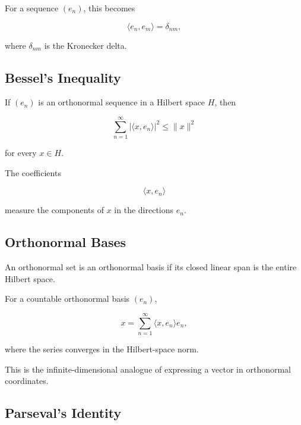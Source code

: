 For a sequence \((e_n)\), this becomes

\[
\boxed{
\langle e_n,e_m\rangle
=
\delta_{nm},
}
\]

where \(\delta_{nm}\) is the Kronecker delta.

\subsection{Bessel's Inequality}
\label{subsec:bessels-inequality}

\begin{theorem}
If \((e_n)\) is an orthonormal sequence in a Hilbert space \(H\), then

\[
\boxed{
\sum_{n=1}^{\infty}
|\langle x,e_n\rangle|^2
\leq
\|x\|^2
}
\]

for every \(x\in H\).
\end{theorem}

The coefficients

\[
\langle x,e_n\rangle
\]

measure the components of \(x\) in the directions \(e_n\).

\subsection{Orthonormal Bases}
\label{subsec:orthonormal-bases}

An orthonormal set is an orthonormal basis if its closed linear span is the
entire Hilbert space.

For a countable orthonormal basis \((e_n)\),

\[
\boxed{
x
=
\sum_{n=1}^{\infty}
\langle x,e_n\rangle e_n,
}
\]

where the series converges in the Hilbert-space norm.

This is the infinite-dimensional analogue of expressing a vector in
orthonormal coordinates.

\subsection{Parseval's Identity}
\label{subsec:parsevals-identity-functional}

